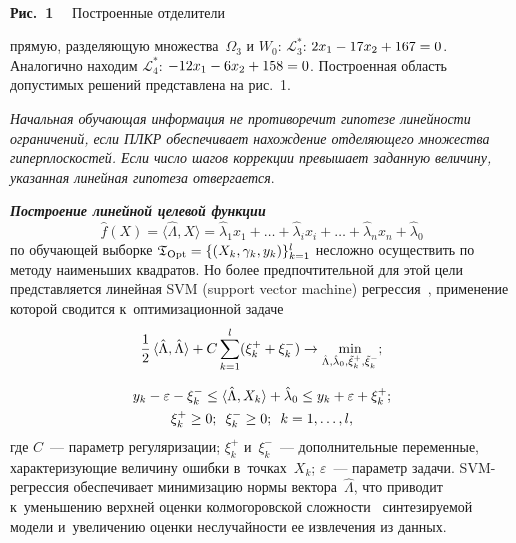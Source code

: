 \begin{multicols}{2}
\vspace*{3pt}

\renewcommand{\figurename}{\protect\bf Рис.}
\setcounter{figure}{1}

{ \begin{center}  %
 \vspace*{1pt}
    \mbox{%
 \epsfxsize=79mm 
 }


\vspace*{3pt}

\noindent
{{\figurename~1}\ \ \small{
Построенные отделители 
}}
\end{center}}


\vspace*{9pt}


\noindent
  прямую,
 разделяющую множества~$\Omega_3$
и $W_0$:  $\mathcal{L}_3^{*}$:  $2x_1\hm-17x_2\hm+167=0$. 
Аналогично находим  $\mathcal{ L}_4^{*}$: $-12x_1\hm-6x_2\hm+158=0$. 
Построенная область до\-пус\-ти\-мых решений представлена на рис.~1.

\textit{Начальная обучающая  информация не противоречит гипотезе 
линейности ограничений, если ПЛКР обеспечивает нахождение отделяющего 
множества гиперплоскостей. Если число шагов коррекции превышает 
заданную величину, указанная линейная гипотеза отвергается}.

{\bfseries\textit{Построение линейной целевой функции}} 
$$
\hat{f}(X)=\langle \hat{\Lambda},X \rangle = \hat{\lambda}_1x_1
+\dots + \hat{\lambda}_ix_i+\dots +\hat{\lambda}_nx_n 
+\hat{\lambda}_0
$$ 
по обучающей выборке $\mathfrak{T}_{\mathrm{Opt}}\hm=
\{ (X_k,\gamma_k,y_k)\}_{k=1}^l$  несложно осуществить по методу 
наименьших квад\-ра\-тов. Но более предпочтительной для этой цели 
представляется линейная SVM (support vector machine) ре\-грес\-сия~\cite{12-don}, применение 
которой сводится к~оптимизационной задаче
$$
\displaystyle\frac{\displaystyle 1\mathstrut}{\displaystyle 2\mathstrut}\,\langle \hat{\Lambda},\hat{\Lambda} \rangle + C \sum_{k=1}^l
(\xi_k^{+}+\xi_k^{-}) \rightarrow 
\underset{\hat{\Lambda},\hat{\lambda}_0,\tilde{\xi}_k^{+},\tilde{\xi}_k^{-}} {\min}; 
$$

\noindent
\begin{gather*}
y_k-\varepsilon -\xi_k^{-} \leq \langle \hat{\Lambda},X_k\rangle + \hat{\lambda}_0 \leq
y_k + \varepsilon + \xi_k^{+}; \\
\xi_k^{+} \geq 0; \enskip \xi_k^{-} \geq 0; \enskip k=1,\dots,l,
\end{gather*}
где $C$~--- параметр регуляризации;  $\xi_k^{+}$ и~$\xi_k^{-}$~--- 
дополнительные переменные, характеризующие величину ошибки в~точках~$X_k$; 
$\varepsilon$~--- параметр задачи.
SVM-ре\-грес\-сия обеспечивает минимизацию нормы вектора~$\hat{\Lambda}$, 
что приводит к~уменьшению верхней оценки колмогоровской сложности~\cite{6-don}  
синтезируемой модели и~увеличению оценки неслучайности ее извлечения из данных.


\end{multicols}
